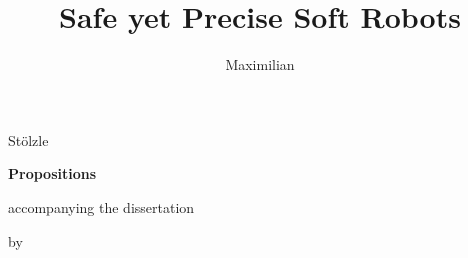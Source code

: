 \documentclass{propositions}
\begin{document}
\title[Incorporating Physics into Learned Models for Control]{Safe yet Precise Soft Robots}

\author{Maximilian}{Stölzle}

\begin{center}

{\Large\titlefont\bfseries Propositions}

\medskip

accompanying the dissertation

\medskip

{\makeatletter
\titlestyle\bfseries\large\@title
\makeatother}

{\makeatletter
\ifx\@subtitle\undefined\else
    \titlefont\titleshape\@subtitle
\fi
\makeatother}

\medskip

by

\medskip

\makeatletter
{\large\titlefont\bfseries\@firstname\ {\titleshape\@lastname}}
\makeatother

\end{center}

\end{document}

